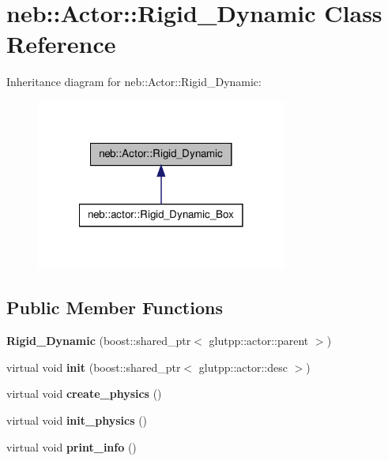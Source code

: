 \hypertarget{classneb_1_1Actor_1_1Rigid__Dynamic}{\section{neb\-:\-:\-Actor\-:\-:\-Rigid\-\_\-\-Dynamic \-Class \-Reference}
\label{classneb_1_1Actor_1_1Rigid__Dynamic}
}


\-Inheritance diagram for neb\-:\-:\-Actor\-:\-:\-Rigid\-\_\-\-Dynamic\-:\nopagebreak
\begin{figure}[H]
\begin{center}
\leavevmode
\includegraphics[width=234pt]{classneb_1_1Actor_1_1Rigid__Dynamic__inherit__graph}
\end{center}
\end{figure}
\subsection*{\-Public \-Member \-Functions}
\begin{DoxyCompactItemize}
\item 
\hypertarget{classneb_1_1Actor_1_1Rigid__Dynamic_a2e4d16eec6b3a7380d70c9d7d466e5bb}{{\bfseries \-Rigid\-\_\-\-Dynamic} (boost\-::shared\-\_\-ptr$<$ glutpp\-::actor\-::parent $>$)}\label{classneb_1_1Actor_1_1Rigid__Dynamic_a2e4d16eec6b3a7380d70c9d7d466e5bb}

\item 
\hypertarget{classneb_1_1Actor_1_1Rigid__Dynamic_aafeadc8a6f50516b73518bb01fd0dc88}{virtual void {\bfseries init} (boost\-::shared\-\_\-ptr$<$ glutpp\-::actor\-::desc $>$)}\label{classneb_1_1Actor_1_1Rigid__Dynamic_aafeadc8a6f50516b73518bb01fd0dc88}

\item 
\hypertarget{classneb_1_1Actor_1_1Rigid__Dynamic_adefdc5dc7aeaffe4f11474c6fa8dd5a7}{virtual void {\bfseries create\-\_\-physics} ()}\label{classneb_1_1Actor_1_1Rigid__Dynamic_adefdc5dc7aeaffe4f11474c6fa8dd5a7}

\item 
\hypertarget{classneb_1_1Actor_1_1Rigid__Dynamic_a8a5f3edafc98b3e0219e2f5466a96959}{virtual void {\bfseries init\-\_\-physics} ()}\label{classneb_1_1Actor_1_1Rigid__Dynamic_a8a5f3edafc98b3e0219e2f5466a96959}

\item 
\hypertarget{classneb_1_1Actor_1_1Rigid__Dynamic_a9c4b73f164c7a5699b769430bedebab4}{virtual void {\bfseries print\-\_\-info} ()}\label{classneb_1_1Actor_1_1Rigid__Dynamic_a9c4b73f164c7a5699b769430bedebab4}

\end{DoxyCompactItemize}


